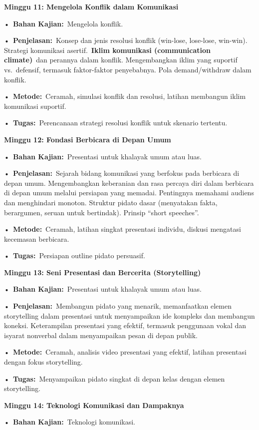 \documentclass[
  letterpaper,
  DIV=11,
  numbers=noendperiod]{scrreprt}
\begin{document}
\textbf{Minggu 11: Mengelola Konflik dalam Komunikasi}

•~\textbf{Bahan Kajian:}~Mengelola konflik.

•~\textbf{Penjelasan:}~Konsep dan jenis resolusi konflik (win-lose,
lose-lose, win-win). Strategi komunikasi asertif.~\textbf{Iklim
komunikasi (communication climate)}~dan perannya dalam konflik.
Mengembangkan iklim yang suportif vs.~defensif, termasuk faktor-faktor
penyebabnya. Pola demand/withdraw dalam konflik.

•~\textbf{Metode:}~Ceramah, simulasi konflik dan resolusi, latihan
membangun iklim komunikasi suportif.

•~\textbf{Tugas:}~Perencanaan strategi resolusi konflik untuk skenario
tertentu.

\textbf{Minggu 12: Fondasi Berbicara di Depan Umum}

•~\textbf{Bahan Kajian:}~Presentasi untuk khalayak umum atau luas.

•~\textbf{Penjelasan:}~Sejarah bidang komunikasi yang berfokus pada
berbicara di depan umum. Mengembangkan keberanian dan rasa percaya diri
dalam berbicara di depan umum melalui persiapan yang memadai. Pentingnya
memahami audiens dan menghindari monoton. Struktur pidato dasar
(menyatakan fakta, berargumen, seruan untuk bertindak). Prinsip ``short
speeches''.

•~\textbf{Metode:}~Ceramah, latihan singkat presentasi individu, diskusi
mengatasi kecemasan berbicara.

•~\textbf{Tugas:}~Persiapan outline pidato persuasif.

\textbf{Minggu 13: Seni Presentasi dan Bercerita (Storytelling)}

•~\textbf{Bahan Kajian:}~Presentasi untuk khalayak umum atau luas.

•~\textbf{Penjelasan:}~Membangun pidato yang menarik, memanfaatkan
elemen storytelling dalam presentasi untuk menyampaikan ide kompleks dan
membangun koneksi. Keterampilan presentasi yang efektif, termasuk
penggunaan vokal dan isyarat nonverbal dalam menyampaikan pesan di depan
publik.

•~\textbf{Metode:}~Ceramah, analisis video presentasi yang efektif,
latihan presentasi dengan fokus storytelling.

•~\textbf{Tugas:}~Menyampaikan pidato singkat di depan kelas dengan
elemen storytelling.

\textbf{Minggu 14: Teknologi Komunikasi dan Dampaknya}

•~\textbf{Bahan Kajian:}~Teknologi komunikasi.
\end{document}
